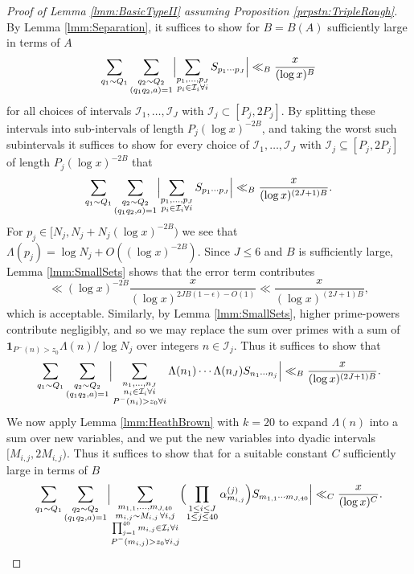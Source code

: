 \documentclass[10pt]{amsart}
\theoremstyle{plain}
\numberwithin{equation}{section}
\begin{document}
%
%
%
%
\begin{proof}[Proof of Lemma \ref{lmm:BasicTypeII} assuming Proposition \ref{prpstn:TripleRough}]
By Lemma \ref{lmm:Separation}, it suffices to show for $B=B(A)$ sufficiently large in terms of $A$
\[
\sum_{q_1\sim Q_1}\sum_{\substack{q_2\sim Q_2\\ (q_1q_2,a)=1}}\Bigl|\sum_{\substack{p_1,\dots,p_J\\ p_i\in \mathcal{I}_i\forall i}}S_{p_1\cdots p_J}\Bigr|\ll_{B}\frac{x}{(\log{x})^{B}}
\]
for all choices of intervals $\mathcal{I}_1,\dots,\mathcal{I}_J$ with $\mathcal{I}_j\subset[P_j,2P_j]$. By splitting these intervals into sub-intervals of length $P_j(\log{x})^{-2B}$, and taking the worst such subintervals it suffices to show for every choice of $\mathcal{I}_1,\dots, \mathcal{I}_J$ with $\mathcal{I}_j\subseteq[P_j,2P_j]$ of length $P_j(\log{x})^{-2B}$ that
\[
\sum_{q_1\sim Q_1}\sum_{\substack{q_2\sim Q_2\\ (q_1q_2,a)=1}}\Bigl|\sum_{\substack{p_1,\dots,p_J\\ p_i\in \mathcal{I}_i\forall i}}S_{p_1\cdots p_J}\Bigr|\ll_{B}\frac{x}{(\log{x})^{(2J+1)B}}.
\]
For $p_j\in [N_j,N_j+N_j(\log{x})^{-2B})$ we see that $\Lambda(p_j)=\log{N_j}+O((\log{x})^{-2B})$. Since $J\le 6$ and $B$ is sufficiently large, Lemma \ref{lmm:SmallSets} shows that the error term contributes
\[
\ll (\log{x})^{-2B}\frac{x}{(\log{x})^{2 J B(1-\epsilon)-O(1)}}\ll \frac{x}{(\log{x})^{(2J+1)B}},
\]
which is acceptable. Similarly, by Lemma \ref{lmm:SmallSets}, higher prime-powers contribute negligibly, and so we may replace the sum over primes with a sum of $\mathbf{1}_{P^-(n)>z_0}\Lambda(n)/\log{N_j}$ over integers $n\in\mathcal{I}_j$. Thus it suffices to show that
 \[
\sum_{q_1\sim Q_1}\sum_{\substack{q_2\sim Q_2\\ (q_1q_2,a)=1}}\Bigl|\sum_{\substack{n_1,\dots,n_J\\ n_i\in \mathcal{I}_i\forall i\\ P^-(n_i)>z_0\forall i}}\Lambda(n_1)\cdots \Lambda(n_J) S_{n_1\cdots n_j}\Bigr|\ll_{B}\frac{x}{(\log{x})^{(2J+1)B}}.
 \]
 We now apply Lemma \ref{lmm:HeathBrown} with $k=20$ to expand $\Lambda(n)$ into a sum over new variables, and we put the new variables into dyadic intervals $[M_{i,j},2M_{i,j})$.  Thus it suffices to show that for a suitable constant $C$ sufficiently large in terms of $B$ 
 \[
\sum_{q_1\sim Q_1}\sum_{\substack{q_2\sim Q_2\\ (q_1q_2,a)=1}}\Bigl|\sum_{\substack{m_{1,1},\dots, m_{J,40}\\ m_{i,j}\sim M_{i,j}\,\forall i,j\\ \prod_{j=1}^{40} m_{i,j}\in \mathcal{I}_i\forall i\\ P^-(m_{i,j})>z_0\forall i,j}}\Bigl(\prod_{\substack{1\le i\le J\\ 1\le j\le 40}}\alpha_{m_{i,j}}^{(j)}\Bigr) S_{m_{1,1}\cdots m_{J,40}}\Bigr|\ll_{C}\frac{x}{(\log{x})^{C}}.
\]
\end{proof}
\end{document}
